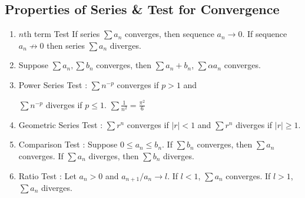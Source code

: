 \subsection{Properties of Series \& Test for Convergence}
\begin{enumerate}
	\item $n$th term Test
		\subitem If series $\sum a_n$ converges, then sequence $a_n \to 0$. 
		\subitem If sequence $a_n \not\to 0$ then series $\sum a_n$ diverges.
	\item Suppose $\sum a_n, \sum b_n$ converges, then $\sum a_n+b_n$, $\sum \alpha a_n$ converges.
	\item Power Series Test : 
		\subitem $\sum n^{-p}$ converges if $p>1$ and

		\subitem $\sum n^{-p}$ diverges if $p \le 1$.
		\subitem $\sum \frac{1}{n^2} = \frac{\pi^2}{6}$
	\item Geometric Series Test :
		\subitem $\sum r^n$ converges if $|r| < 1$ and 
		\subitem $\sum r^n$ diverges if $|r| \ge 1$.
	\item Comparison Test : Suppose $0 \le a_n \le b_n$.
		\subitem If $\sum b_n$ converges, then $\sum a_n$ converges. 
		\subitem If $\sum a_n$ diverges, then $\sum b_n$ diverges.
	\item Ratio Test : Let $a_n > 0$ and $a_{n+1}/a_n \to l$.
		\subitem If $l<1$, $\sum a_n$ converges.
		\subitem If $l>1$, $\sum a_n$ diverges.


\end{enumerate}
